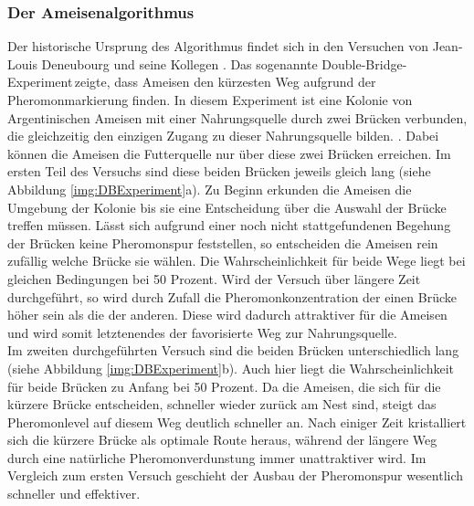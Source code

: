 \documentclass[doktyp=barbeit, sprache=german]{TUBAFarbeiten}
\begin{document}
\subsubsection{Der Ameisenalgorithmus}
Der historische Ursprung des Algorithmus findet sich in den Versuchen von Jean-Louis Deneubourg und seine Kollegen \cite{Biological}. Das sogenannte \glqq Double-Bridge-Experiment\grqq \,zeigte, dass Ameisen den kürzesten Weg aufgrund der Pheromonmarkierung finden. In diesem Experiment ist eine Kolonie von Argentinischen Ameisen mit einer Nahrungsquelle durch zwei Brücken verbunden, die gleichzeitig den einzigen Zugang zu dieser Nahrungsquelle bilden. \cite{Dorigo2007}. Dabei können die Ameisen die Futterquelle nur über diese zwei Brücken erreichen. Im ersten Teil des Versuchs sind diese beiden Brücken jeweils gleich lang (siehe Abbildung \ref{img:DBExperiment}a). Zu Beginn erkunden die Ameisen die Umgebung der Kolonie bis sie eine Entscheidung über die Auswahl der Brücke treffen müssen. Lässt sich aufgrund einer noch nicht stattgefundenen Begehung der Brücken keine Pheromonspur feststellen, so entscheiden die Ameisen rein zufällig welche Brücke sie wählen. Die Wahrscheinlichkeit für beide Wege liegt bei gleichen Bedingungen bei 50 Prozent. Wird der Versuch über längere Zeit durchgeführt, so wird durch Zufall die Pheromonkonzentration der einen Brücke höher sein als die der anderen. Diese wird dadurch attraktiver für die Ameisen und wird somit letztenendes der favorisierte Weg zur Nahrungsquelle. 
\\Im zweiten durchgeführten Versuch sind die beiden Brücken unterschiedlich lang (siehe Abbildung \ref{img:DBExperiment}b). Auch hier liegt die Wahrscheinlichkeit für beide Brücken zu Anfang bei 50 Prozent. Da die Ameisen, die sich für die kürzere Brücke entscheiden, schneller wieder zurück am Nest sind, steigt das Pheromonlevel auf diesem Weg deutlich schneller an. Nach einiger Zeit kristalliert sich die kürzere Brücke als optimale Route heraus, während der längere Weg durch eine natürliche Pheromonverdunstung immer unattraktiver wird. Im Vergleich zum ersten Versuch geschieht der Ausbau der Pheromonspur wesentlich schneller und effektiver.
\end{document}
